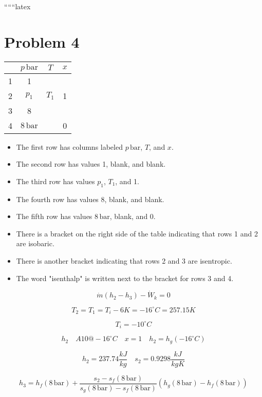 
``````latex


\section*{Problem 4}

\begin{tabular}{|c|c|c|c|}
\hline
 & $p \, \text{bar}$ & $T$ & $x$ \\
\hline
1 & 1 & & \\
\hline
2 & $p_1$ & $T_1$ & 1 \\
\hline
3 & 8 & & \\
\hline
4 & $8 \, \text{bar}$ & & 0 \\
\hline
\end{tabular}

\begin{itemize}
    \item The first row has columns labeled $p \, \text{bar}$, $T$, and $x$.
    \item The second row has values 1, blank, and blank.
    \item The third row has values $p_1$, $T_1$, and 1.
    \item The fourth row has values 8, blank, and blank.
    \item The fifth row has values $8 \, \text{bar}$, blank, and 0.
\end{itemize}

\begin{itemize}
    \item There is a bracket on the right side of the table indicating that rows 1 and 2 are isobaric.
    \item There is another bracket indicating that rows 2 and 3 are isentropic.
    \item The word "isenthalp" is written next to the bracket for rows 3 and 4.
\end{itemize}

\[
\dot{m} (h_2 - h_3) - \dot{W}_k = 0
\]

\[
T_2 = T_1 = T_i - 6K = -16^\circ C = 257.15K
\]

\[
T_i = -10^\circ C
\]

\[
h_2 \quad A10 @ -16^\circ C \quad x = 1 \quad h_2 = h_g(-16^\circ C)
\]

\[
h_2 = 237.74 \frac{kJ}{kg} \quad s_2 = 0.9298 \frac{kJ}{kgK}
\]

\[
h_3 = h_f(8 \, \text{bar}) + \frac{s_2 - s_f(8 \, \text{bar})}{s_g(8 \, \text{bar}) - s_f(8 \, \text{bar})} (h_g(8 \, \text{bar}) - h_f(8 \, \text{bar}))
\]

